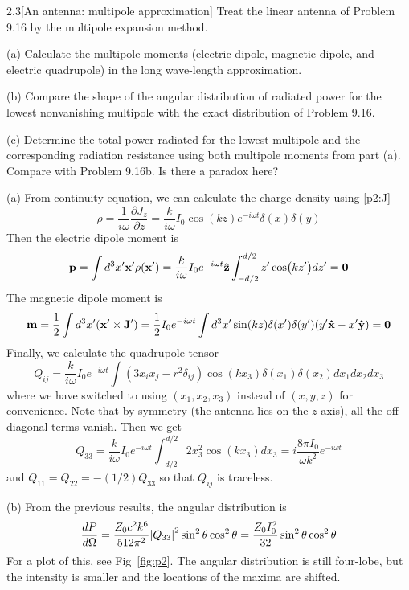 \documentclass[12pt]{article}
\begin{document}
\begin{problem}{2.3}[An antenna: multipole approximation]
Treat the linear antenna of Problem 9.16 by the multipole expansion method.

(a) Calculate the multipole moments (electric dipole, magnetic dipole, and
electric quadrupole) in the long wave-length approximation.

(b) Compare the shape of the angular distribution of radiated power for the
lowest nonvanishing multipole with the exact distribution of Problem 9.16.

(c) Determine the total power radiated for the lowest multipole and the
corresponding radiation resistance using both multipole moments from part (a).
Compare with Problem 9.16b. Is there a paradox here?
\begin{solution}
(a) From continuity equation, we can calculate the charge density using
\eqref{p2:J}
\begin{equation}
    \rho=\frac1{i\omega}\frac{\partial J_z}{\partial z}
    =\frac{k}{i\omega}I_0\cos(kz)e^{-i\omega t}\delta(x)\delta(y)
\end{equation}
Then the electric dipole moment is
\begin{equation}
    \vb{p}=\int d^3x'\vb{x}'\rho(\vb{x}')
    =\frac{k}{i\omega}I_0e^{-i\omega t}\vb{\hat{z}}\int_{-d/2}^{d/2}z'\cos(kz')dz'
    =\vb{0}
\end{equation}
The magnetic dipole moment is
\begin{equation}
    \vb{m}=\frac12\int d^3x'(\vb{x}'\times\vb{J}') 
    =\frac12 I_0e^{-i\omega t}\int
    d^3x'\sin(kz)\delta(x')\delta(y')(y'\vb{\hat{x}}-x'\vb{\hat{y}})
    =\vb{0}
\end{equation}
Finally, we calculate the quadrupole tensor
\begin{equation}
    Q_{ij}=\frac{k}{i\omega}I_0e^{-i\omega t}\int(3x_ix_j-r^2\delta_{ij}) 
    \cos(kx_3)\delta(x_1)\delta(x_2)dx_1dx_2dx_3
\end{equation}
where we have switched to using $(x_1,x_2,x_3)$ instead of $(x,y,z)$ for
convenience. Note that by symmetry (the antenna lies on the $z$-axis), all the 
off-diagonal terms vanish. Then we get
\begin{equation}
    Q_{33}=\frac{k}{i\omega}I_0e^{-i\omega
    t}\int_{-d/2}^{d/2}2x_3^2\cos(kx_3)dx_3
    =i\frac{8\pi I_0}{\omega k^2}e^{-i\omega t}
\end{equation}
and $Q_{11}=Q_{22}=-(1/2)Q_{33}$ so that $Q_{ij}$ is traceless.

(b) From the previous results, the angular distribution is
\begin{equation}
    \frac{dP}{d\Omega}
    =\frac{Z_0c^2k^6}{512\pi^2}\abs{Q_{33}}^2\sin^2\theta\cos^2\theta
    =\frac{Z_0I_0^2}{32}\sin^2\theta\cos^2\theta
\end{equation}
For a plot of this, see Fig~\ref{fig:p2}. The angular distribution is still 
four-lobe, but the intensity is smaller and the locations of the maxima are 
shifted.


\end{solution}
\end{problem}
\end{document}
